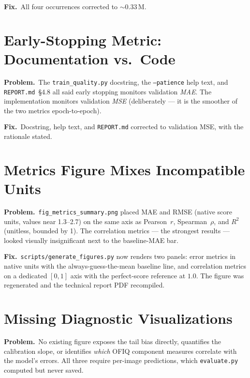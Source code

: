 \documentclass[12pt, letterpaper]{article}
\newcommand{\code}[1]{\texttt{#1}}
\newcommand{\problem}[1]{\textbf{Problem.}~#1}
\newcommand{\fix}[1]{\textbf{Fix.}~#1}
\begin{document}
\fix{All four occurrences corrected to ${\sim}0.33$\,M.}

\section{Early-Stopping Metric: Documentation vs.\ Code}

\problem{The \code{train\_quality.py} docstring, the \code{--patience} help text, and
\code{REPORT.md}~\S4.8 all said early stopping monitors validation \emph{MAE}. The
implementation monitors validation \emph{MSE} (deliberately --- it is the smoother of
the two metrics epoch-to-epoch).}

\fix{Docstring, help text, and \code{REPORT.md} corrected to validation MSE, with the
rationale stated.}

\section{Metrics Figure Mixes Incompatible Units}

\problem{\code{fig\_metrics\_summary.png} placed MAE and RMSE (native score units,
values near 1.3--2.7) on the same axis as Pearson~$r$, Spearman~$\rho$, and $R^2$
(unitless, bounded by 1). The correlation metrics --- the strongest results --- looked
visually insignificant next to the baseline-MAE bar.}

\fix{\code{scripts/generate\_figures.py} now renders two panels: error metrics in native
units with the always-guess-the-mean baseline line, and correlation metrics on a
dedicated $[0, 1]$ axis with the perfect-score reference at $1.0$. The figure was
regenerated and the technical report PDF recompiled.}

\section{Missing Diagnostic Visualizations}

\problem{No existing figure exposes the tail bias directly, quantifies the calibration
slope, or identifies \emph{which} OFIQ component measures correlate with the model's
errors. All three require per-image predictions, which \code{evaluate.py} computed but
never saved.}
\end{document}
